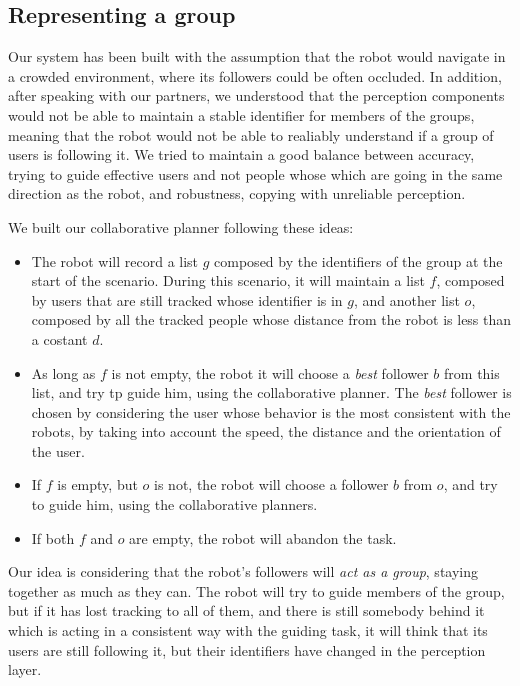 \subsection{Representing a group}
Our system has been built with the assumption that the robot would navigate in a crowded environment, where its followers could be often occluded. In addition, after speaking with our partners, we understood that the perception components would not be able to maintain a stable identifier for members of the groups, meaning that the robot would not be able to realiably understand if a group of users is following it. We tried to maintain a good balance between accuracy, trying to guide effective users and not people whose which are going in the same direction as the robot, and robustness, copying with unreliable perception.

We built our collaborative planner following these ideas:
\begin{itemize}
\item The robot will record a list $g$ composed by the identifiers of the group at the start of the scenario. During this scenario, it will maintain a list $f$, composed by users that are still tracked whose identifier is in $g$, and another list $o$, composed by all the tracked people whose distance from the robot is less than a costant $d$. 
\item As long as $f$ is not empty, the robot it will choose a \textit{best} follower $b$ from this list, and try tp guide him, using the collaborative planner. The \textit{best} follower is chosen by considering the user whose behavior is the most consistent with the robots, by taking into account the speed, the distance and the orientation of the user.
\item If $f$ is empty, but $o$ is not, the robot will choose a  follower $b$ from $o$, and try to guide him, using the collaborative planners.
\item If  both $f$ and $o$ are empty, the robot will abandon the task.
\end{itemize}

Our idea is considering that the robot's followers will \textit{act as a group}, staying together as much as they can. The robot will try to guide members of the group, but if it has lost tracking to all of them, and there is still somebody behind it which is acting in a consistent way with the guiding task, it will think that its users are still following it, but their identifiers have changed in the perception layer.


